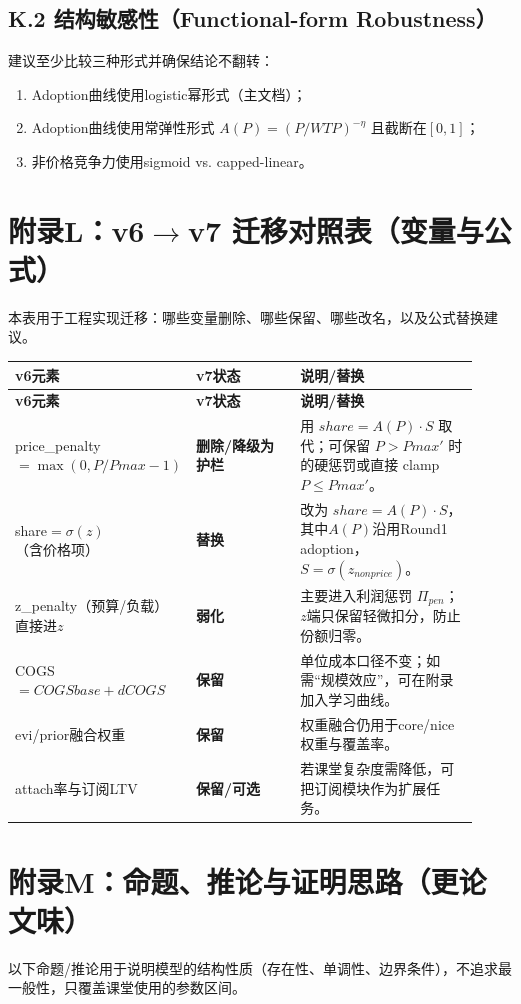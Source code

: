 \documentclass[UTF8,12pt]{ctexart}
\begin{document}
\subsection{K.2 结构敏感性（Functional-form Robustness）}
建议至少比较三种形式并确保结论不翻转：
\begin{enumerate}[label=(\arabic*)]
  \item Adoption曲线使用logistic幂形式（主文档）；
  \item Adoption曲线使用常弹性形式 $A(P)=(P/WTP)^{-\eta}$ 且截断在$[0,1]$；
  \item 非价格竞争力使用sigmoid vs. capped-linear。
\end{enumerate}

\section{附录L：v6$\rightarrow$v7 迁移对照表（变量与公式）}
本表用于工程实现迁移：哪些变量删除、哪些保留、哪些改名，以及公式替换建议。

\begin{longtable}{p{0.18\linewidth}p{0.30\linewidth}p{0.44\linewidth}}
\toprule
\textbf{v6元素} & \textbf{v7状态} & \textbf{说明/替换} \\
\midrule
\endfirsthead
\toprule
\textbf{v6元素} & \textbf{v7状态} & \textbf{说明/替换} \\
\midrule
\endhead
price\_penalty$=\max(0,P/Pmax-1)$ & \textbf{删除/降级为护栏} & 用 $share=A(P)\cdot S$ 取代；可保留 $P>Pmax'$ 时的硬惩罚或直接 clamp $P\le Pmax'$。\\
share$=\sigma(z)$（含价格项） & \textbf{替换} & 改为 $share=A(P)\cdot S$，其中$A(P)$沿用Round1 adoption，$S=\sigma(z_{nonprice})$。\\
z\_penalty（预算/负载）直接进$z$ & \textbf{弱化} & 主要进入利润惩罚 $\Pi_{pen}$；$z$端只保留轻微扣分，防止份额归零。\\
COGS$=COGSbase+dCOGS$ & \textbf{保留} & 单位成本口径不变；如需“规模效应”，可在附录加入学习曲线。\\
evi/prior融合权重 & \textbf{保留} & 权重融合仍用于core/nice权重与覆盖率。\\
attach率与订阅LTV & \textbf{保留/可选} & 若课堂复杂度需降低，可把订阅模块作为扩展任务。\\
\bottomrule
\end{longtable}

\section{附录M：命题、推论与证明思路（更论文味）}
以下命题/推论用于说明模型的结构性质（存在性、单调性、边界条件），不追求最一般性，只覆盖课堂使用的参数区间。
\end{document}
